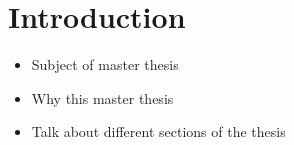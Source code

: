 \section{Introduction}

\begin{itemize}
	\item Subject of master thesis
	\item Why this master thesis
	\item Talk about different sections of the thesis
\end{itemize}
